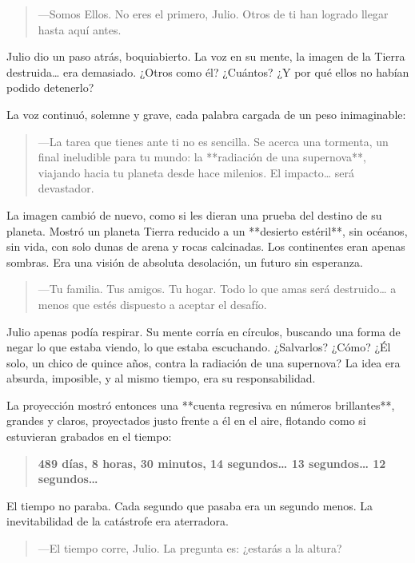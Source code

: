 \documentclass[a4paper,12pt]{book}
\begin{document}
\begin{quote}
    —Somos Ellos. No eres el primero, Julio. Otros de ti han logrado llegar hasta aquí antes.
\end{quote}

Julio dio un paso atrás, boquiabierto. La voz en su mente, la imagen de la Tierra destruida… era demasiado. ¿Otros como él? ¿Cuántos? ¿Y por qué ellos no habían podido detenerlo?

La voz continuó, solemne y grave, cada palabra cargada de un peso inimaginable:

\begin{quote}
    —La tarea que tienes ante ti no es sencilla. Se acerca una tormenta, un final ineludible para tu mundo: la **radiación de una supernova**, viajando hacia tu planeta desde hace milenios. El impacto… será devastador.
\end{quote}

La imagen cambió de nuevo, como si les dieran una prueba del destino de su planeta. Mostró un planeta Tierra reducido a un **desierto estéril**, sin océanos, sin vida, con solo dunas de arena y rocas calcinadas. Los continentes eran apenas sombras. Era una visión de absoluta desolación, un futuro sin esperanza.

\begin{quote}
    —Tu familia. Tus amigos. Tu hogar. Todo lo que amas será destruido… a menos que estés dispuesto a aceptar el desafío.
\end{quote}

Julio apenas podía respirar. Su mente corría en círculos, buscando una forma de negar lo que estaba viendo, lo que estaba escuchando. ¿Salvarlos? ¿Cómo? ¿Él solo, un chico de quince años, contra la radiación de una supernova? La idea era absurda, imposible, y al mismo tiempo, era su responsabilidad.

La proyección mostró entonces una **cuenta regresiva en números brillantes**, grandes y claros, proyectados justo frente a él en el aire, flotando como si estuvieran grabados en el tiempo:

\begin{quote}
    \textbf{489 días, 8 horas, 30 minutos, 14 segundos… 13 segundos… 12 segundos…}
\end{quote}

El tiempo no paraba. Cada segundo que pasaba era un segundo menos. La inevitabilidad de la catástrofe era aterradora.

\begin{quote}
    —El tiempo corre, Julio. La pregunta es: ¿estarás a la altura?
\end{quote}
\end{document}
